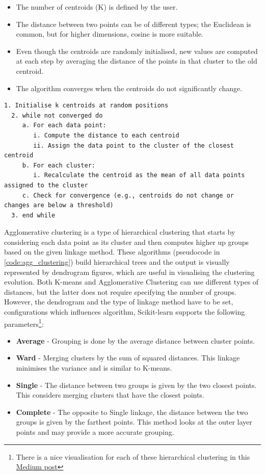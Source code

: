 \begin{itemize}
  \item The number of centroids (K) is defined by the user.
  \item The distance between two points can be of different types; the Euclidean is common, but for higher dimensions, cosine is more suitable.
  \item Even though the centroids are randomly initialised, new values are computed at each step by averaging the distance of the points in that cluster to the old centroid.
  \item The algorithm converges when the centroids do not significantly change.
\end{itemize}

\begin{lstlisting}[float=!htb, caption={K-means pseudocode}, label={code:k-means}]
  1. Initialise k centroids at random positions
  2. while not converged do
     a. For each data point:
        i. Compute the distance to each centroid
        ii. Assign the data point to the cluster of the closest centroid
     b. For each cluster:
        i. Recalculate the centroid as the mean of all data points assigned to the cluster
     c. Check for convergence (e.g., centroids do not change or changes are below a threshold)
  3. end while
\end{lstlisting}


Agglomerative clustering is a type of hierarchical clustering that starts by considering each data point as its cluster and then computes higher up groups based on the given linkage method. These algorithms (pseudocode in \cref{code:agg_clustering}) build hierarchical trees and the output is visually represented by dendrogram figures, which are useful in visualising the clustering evolution. Both K-means and Agglomerative Clustering can use different types of distances, but the latter does not require specifying the number of groups. However, the dendrogram  and the type of linkage method have to be set, configurations which influences algorithm, Scikit-learn supports the following parameters\footnote{There is a nice visualisation for each of these hierarchical clustering in this \href{https://towardsdatascience.com/machine-learning-algorithms-part-12-hierarchical-agglomerative-clustering-example-in-python-1e18e0075019}{Medium post}}:
\begin{itemize}
  \item \textbf{Average} - Grouping is done by the average distance between cluster points.
  \item \textbf{Ward} - Merging clusters by the sum of squared distances. This linkage minimises the variance and is similar to K-means.
  \item \textbf{Single} - The distance between two groups is given by the two closest points. This considers merging clusters that have the closest points.
  \item \textbf{Complete} - The opposite to Single linkage, the distance between the two groups is given by the farthest points. This method looks at the outer layer points and may provide a more accurate grouping.
\end{itemize}


